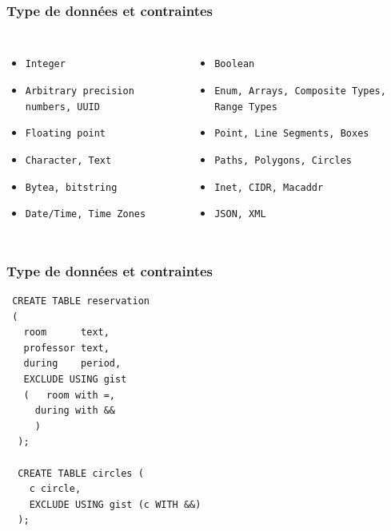 \documentclass{beamer}
\begin{document}
\begin{frame}[fragile]
  \frametitle{Type de données et contraintes}

  \vfill
  
  \begin{columns}[c]

    \begin{itemize}
    \item \texttt{Integer}
    \item \texttt{Arbitrary precision numbers, UUID}
    \item \texttt{Floating point}
    \item \texttt{Character, Text}
    \item \texttt{Bytea, bitstring}
    \item \texttt{Date/Time, Time Zones}
    \end{itemize}  

    \begin{itemize}
    \item \texttt{Boolean}
    \item \texttt{Enum, Arrays, Composite Types, Range Types}
    \item \texttt{Point, Line Segments, Boxes}
    \item \texttt{Paths, Polygons, Circles}
    \item \texttt{Inet, CIDR, Macaddr}
    \item \texttt{JSON, XML}
    \end{itemize}

  \end{columns}
\end{frame}


\begin{frame}[fragile]
  \frametitle{Type de données et contraintes}

  \begin{verbatim}
 CREATE TABLE reservation
 (
   room      text,
   professor text,
   during    period,
   EXCLUDE USING gist
   (   room with =,
     during with &&
     )
  );
     
  CREATE TABLE circles (
    c circle,
    EXCLUDE USING gist (c WITH &&)
  );
  \end{verbatim}
\end{frame}
\end{document}
